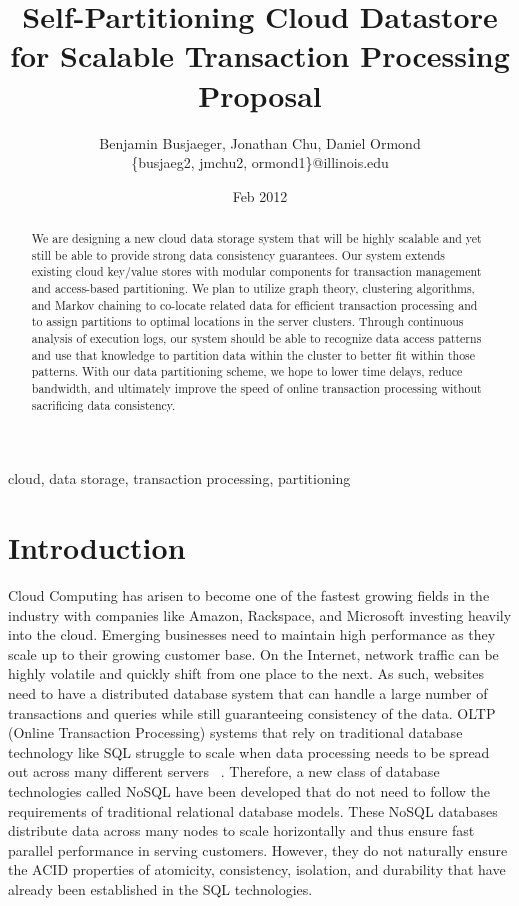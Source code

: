 \documentclass[10pt,final,journal]{IEEEtran}
\begin{document}
\title{Self-Partitioning Cloud Datastore for Scalable Transaction Processing Proposal}
\author{Benjamin Busjaeger, Jonathan Chu, Daniel Ormond \\
\{busjaeg2, jmchu2, ormond1\}@illinois.edu}
\date{Feb 2012}
\maketitle

\begin{abstract}
We are designing a new cloud data storage system that will be highly scalable and yet still be able to provide strong data consistency guarantees. Our system extends existing cloud key/value stores with modular components for transaction management and access-based partitioning. We plan to utilize graph theory, clustering algorithms, and Markov chaining to co-locate related data for efficient transaction processing and to assign partitions to optimal locations in the server clusters. Through continuous analysis of execution logs, our system should be able to recognize data access patterns and use that knowledge to partition data within the cluster to better fit within those patterns. With our data partitioning scheme, we hope to lower time delays, reduce bandwidth, and ultimately improve the speed of online transaction processing without sacrificing data consistency.
\end{abstract}

\begin{IEEEkeywords}
cloud, data storage, transaction processing, partitioning
\end{IEEEkeywords}

\section{Introduction}
Cloud Computing has arisen to become one of the fastest growing fields in the industry with companies like Amazon, Rackspace, and Microsoft investing heavily into the cloud. Emerging businesses need to maintain high performance as they scale up to their growing customer base. On the Internet, network traffic can be highly volatile and quickly shift from one place to the next. As such, websites need to have a distributed database system that can handle a large number of transactions and queries while still guaranteeing consistency of the data. OLTP (Online Transaction Processing) systems that rely on traditional database technology like SQL struggle to scale when data processing needs to be spread out across many different servers ~\cite{Malkowski:2010:EAD:1774088.1774449}. Therefore, a new class of database technologies called NoSQL have been developed that do not need to follow the requirements of traditional relational database models. These NoSQL databases distribute data across many nodes to scale horizontally and thus ensure fast parallel performance in serving customers.  However, they do not naturally ensure the ACID properties of atomicity, consistency, isolation, and durability that have already been established in the SQL technologies.
\end{document}
